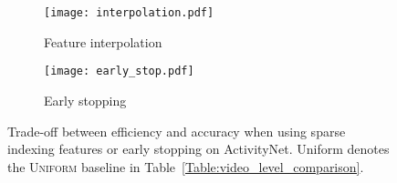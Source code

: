 \begin{figure}
  \begin{subfigure}[b]{0.5\textwidth}
    \texttt{[image: interpolation.pdf]}
     \vspace{-0.2in}
    \caption{Feature interpolation}
    \label{fig:interpolation}
  \end{subfigure}
  \begin{subfigure}[b]{0.49\textwidth}
    \texttt{[image: early\_stop.pdf]}
        \vspace{-0.2in}
    \caption{Early stopping}
    \label{fig:early_stop}
  \end{subfigure}
  \caption{Trade-off between efficiency and accuracy when using sparse indexing features or early stopping on ActivityNet. Uniform denotes the \textsc{Uniform} baseline in Table~\ref{Table:video_level_comparison}.
    \vspace{-0.15in}}
  \vspace{-0.1in}
\end{figure}

